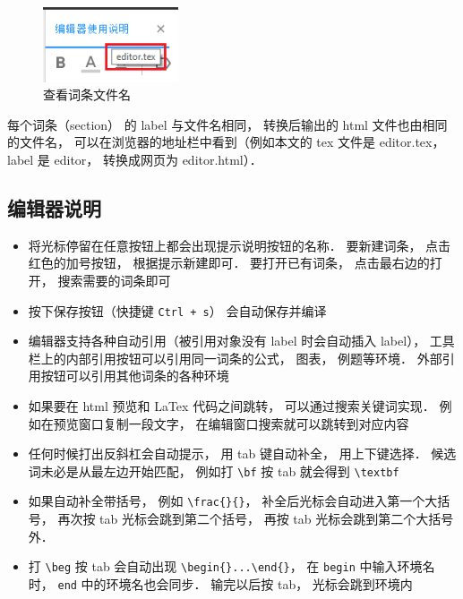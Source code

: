 \begin{figure}[ht]
\centering
\includegraphics[width=4cm]{./figures/editor2.png}
\caption{查看词条文件名} \label{editor_fig2}
\end{figure}

每个词条（section） 的 label 与文件名相同， 转换后输出的 html 文件也由相同的文件名， 可以在浏览器的地址栏中看到（例如本文的 tex 文件是 editor.tex， label 是 editor， 转换成网页为 editor.html）．

\subsection{编辑器说明}
\begin{itemize}
\item 将光标停留在任意按钮上都会出现提示说明按钮的名称． 要新建词条， 点击红色的加号按钮， 根据提示新建即可． 要打开已有词条， 点击最右边的打开， 搜索需要的词条即可

\item 按下保存按钮（快捷键 \lstinline|Ctrl + s|） 会自动保存并编译

\item 编辑器支持各种自动引用（被引用对象没有 label 时会自动插入 label）， 工具栏上的内部引用按钮可以引用同一词条的公式， 图表， 例题等环境． 外部引用按钮可以引用其他词条的各种环境

\item 如果要在 html 预览和 LaTex 代码之间跳转， 可以通过搜索关键词实现． 例如在预览窗口复制一段文字， 在编辑窗口搜索就可以跳转到对应内容

\item 任何时候打出反斜杠会自动提示， 用 tab 键自动补全， 用上下键选择． 候选词未必是从最左边开始匹配， 例如打 \lstinline|\bf| 按 tab 就会得到 \lstinline|\textbf|

\item 如果自动补全带括号， 例如 \lstinline|\frac{}{}|， 补全后光标会自动进入第一个大括号， 再次按 tab 光标会跳到第二个括号， 再按 tab 光标会跳到第二个大括号外．

\item 打 \lstinline|\beg| 按 tab 会自动出现 \lstinline|\begin{}...\end{}|， 在 \lstinline|begin| 中输入环境名时， \lstinline|end| 中的环境名也会同步． 输完以后按 tab， 光标会跳到环境内
\end{itemize}

